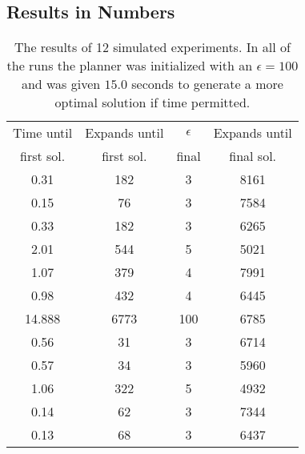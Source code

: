 \documentclass{beamer}
\begin{document}
\subsection{Results in Numbers} 
\begin{frame}
\begin{table}
  \begin{tabular}{| c | c | c | c |}
	\hline
	Time until 	& Expands until &$\epsilon$	& Expands until \\
	first sol.	& first sol. 	&	final	& final sol.	\\ \hline
	0.31 		&182 			&3 			&8161			\\ \hline
	0.15 		&76 			&3 			&7584			\\ \hline
	0.33 		&182 			&3 			&6265			\\ \hline
	2.01 		&544 			&5 			&5021			\\ \hline
	1.07 		&379 			&4 			&7991			\\ \hline
	0.98 		&432 			&4 			&6445			\\ \hline
	14.888		&6773 			&100 		&6785			\\ \hline
	0.56 		&31 			&3 			&6714			\\ \hline
	0.57 		&34 			&3 			&5960			\\ \hline
	1.06 		&322 			&5 			&4932			\\ \hline
	0.14 		&62 			&3 			&7344			\\ \hline
	0.13 		&68 			&3 			&6437			\\ \hline
  \end{tabular}
  \caption{The results of 12 simulated experiments. In all of the runs the
  planner was initialized with an $ \epsilon = 100 $ and was given $15.0$
  seconds to generate a more optimal solution if time permitted.}
\end{table}
\end{frame}
\end{document}
